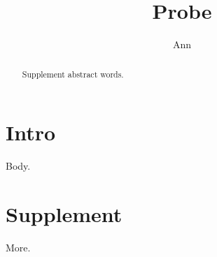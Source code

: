 \documentclass{article}
\begin{document}
\title{Probe}\author{Ann}
\maketitle
{}

\section{Intro}
Body.
\section{Supplement}
\begin{abstract}
Supplement abstract words.
\end{abstract}
More.
\end{document}
